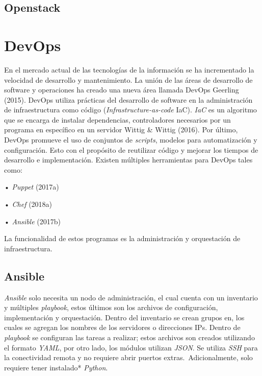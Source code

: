 \documentclass[12pt,twoside]{reedthesis}
\theoremstyle{definition}
\theoremstyle{definition}
\theoremstyle{definition}
\theoremstyle{remark}
\begin{document}
\hypertarget{openstack}{%
\subsection{Openstack}\label{openstack}}

\hypertarget{devops}{%
\section{DevOps}\label{devops}}

En el mercado actual de las tecnologías de la información se ha
incrementado la velocidad de desarrollo y mantenimiento. La unión de las
áreas de desarrollo de software y operaciones ha creado una nueva área
llamada DevOps Geerling (2015). DevOps utiliza prácticas del desarrollo
de software en la administración de infraestructura como código
(\emph{Infrastructure-as-code} IaC). \emph{IaC} es un algoritmo que se
encarga de instalar dependencias, controladores necesarios por un
programa en específico en un servidor Wittig \& Wittig (2016). Por
último, DevOps promueve el uso de conjuntos de \emph{scripts}, modelos
para automatización y configuración. Esto con el propósito de reutilizar
código y mejorar los tiempos de desarrollo e implementación. Existen
múltiples herramientas para DevOps tales como:~

• \emph{Puppet} (2017a)~

• \emph{Chef} (2018a)~

• \emph{Ansible} (2017b)

La funcionalidad de estos programas es la administración y orquestación
de infraestructura.

\hypertarget{ansible}{%
\subsection{Ansible}\label{ansible}}

\emph{Ansible} solo necesita un nodo de administración, el cual cuenta
con un inventario y múltiples \emph{playbook}, estos últimos son los
archivos de configuración, implementación y orquestación. Dentro del
inventario se crean grupos en, los cuales se agregan los nombres de los
servidores o direcciones IPs. Dentro de \emph{playbook} se configuran
las tareas a realizar; estos archivos son creados utilizando el formato
\emph{YAML}, por otro lado, los módulos utilizan \emph{JSON}. Se utiliza
\emph{SSH} para la conectividad remota y no requiere abrir puertos
extras.~Adicionalmente, solo requiere tener instalado* \emph{Python}.
\end{document}
